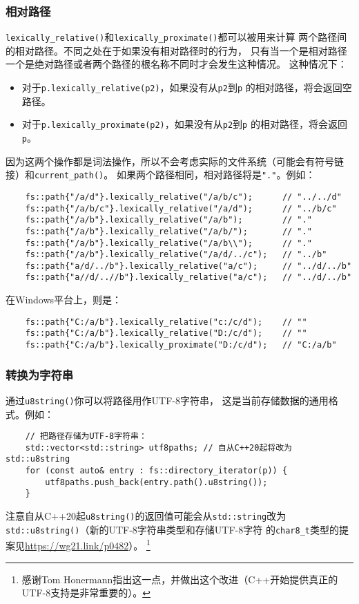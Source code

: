 \subsubsection{相对路径}
\texttt{lexically\_relative()}和\texttt{lexically\_proximate()}都可以被用来计算
两个路径间的相对路径。不同之处在于如果没有相对路径时的行为，
只有当一个是相对路径一个是绝对路径或者两个路径的根名称不同时才会发生这种情况。
这种情况下：
\begin{itemize}
    \item 对于\texttt{p.lexically\_relative(p2)}，如果没有从\texttt{p2}到\texttt{p}
    的相对路径，将会返回空路径。
    \item 对于\texttt{p.lexically\_proximate(p2)}，如果没有从\texttt{p2}到\texttt{p}
    的相对路径，将会返回\texttt{p}。
\end{itemize}
因为这两个操作都是词法操作，所以不会考虑实际的文件系统（可能会有符号链接）和\texttt{current\_path()}。
如果两个路径相同，相对路径将是\texttt{"."}。例如：
\begin{lstlisting}
    fs::path{"/a/d"}.lexically_relative("/a/b/c");      // "../../d"
    fs::path{"/a/b/c"}.lexically_relative("/a/d");      // "../b/c"
    fs::path{"/a/b"}.lexically_relative("/a/b");        // "."
    fs::path{"/a/b"}.lexically_relative("/a/b/");       // "."
    fs::path{"/a/b"}.lexically_relative("/a/b\\");      // "."
    fs::path{"/a/b"}.lexically_relative("/a/d/../c");   // "../b"
    fs::path{"a/d/../b"}.lexically_relative("a/c");     // "../d/../b"
    fs::path{"a//d/..//b"}.lexically_relative("a/c");   // "../d/../b"
\end{lstlisting}
在Windows平台上，则是：
\begin{lstlisting}
    fs::path{"C:/a/b"}.lexically_relative("c:/c/d");    // ""
    fs::path{"C:/a/b"}.lexically_relative("D:/c/d");    // ""
    fs::path{"C:/a/b"}.lexically_proximate("D:/c/d");   // "C:/a/b"
\end{lstlisting}

\subsubsection{转换为字符串}
通过\texttt{u8string()}你可以将路径用作UTF-8字符串，
这是当前存储数据的通用格式。例如：
\begin{lstlisting}
    // 把路径存储为UTF-8字符串：
    std::vector<std::string> utf8paths; // 自从C++20起将改为std::u8string
    for (const auto& entry : fs::directory_iterator(p)) {
        utf8paths.push_back(entry.path().u8string());
    }
\end{lstlisting}
注意自从C++20起\texttt{u8string()}的返回值可能会从\texttt{std::string}改为
\texttt{std::u8string()}（新的UTF-8字符串类型和存储UTF-8字符
的\texttt{char8\_t}类型的提案见\url{https://wg21.link/p0482}）。
\footnote{感谢Tom Honermann指出这一点，并做出这个改进（C++开始提供真正的UTF-8支持是非常重要的）。}

